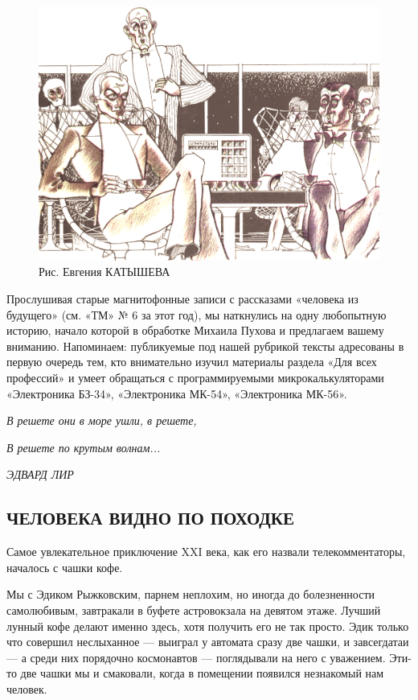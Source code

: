 \documentclass[11pt,a4paper,oneside]{article}
\begin{document}
\begin{figure}[H]
\includegraphics[width=\textwidth]{way_to_the_earth}
\caption{Рис. Евгения КАТЫШЕВА}
\end{figure}

Прослушивая старые магнитофонные записи с рассказами «человека из будущего» (см. «ТМ» № 6 за этот год), мы наткнулись на одну любопытную историю, начало которой в обработке Михаила Пухова и предлагаем вашему вниманию. Напоминаем: публикуемые под нашей рубрикой тексты адресованы в первую очередь тем, кто внимательно изучил материалы раздела «Для всех профессий» и умеет обращаться с программируемыми микрокалькуляторами «Электроника БЗ-34», «Электроника МК-54», «Электроника МК-56».

\textit{В решете они в море ушли, в решете,}

\textit{В решете по крутым волнам...}

\textit{ЭДВАРД ЛИР}

\subsection{ЧЕЛОВЕКА ВИДНО ПО ПОХОДКЕ}

Самое увлекательное приключение XXI века, как его назвали телекомментаторы, началось с чашки кофе.

Мы с Эдиком Рыжковским, парнем неплохим, но иногда до болезненности самолюбивым, завтракали в буфете астровокзала на девятом этаже. Лучший лунный кофе делают именно здесь, хотя получить его не так просто. Эдик только что совершил неслыханное — выиграл у автомата сразу две чашки, и завсегдатаи — а среди них порядочно космонавтов — поглядывали на него с уважением. Эти-то две чашки мы и смаковали, когда в помещении появился незнакомый нам человек.
\end{document}
